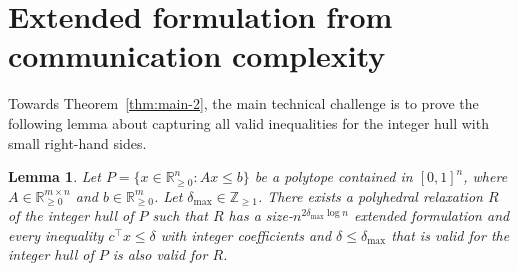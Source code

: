 \documentclass[11pt]{article}
\newcommand{\R}{\mathbb{R}}
\newcommand{\Z}{\mathbb{Z}}
\newcommand{\eps}{\varepsilon}
\newcommand{\rhs}{\delta}
\newtheorem{lemma}[theorem]{Lemma}
\newcommand{\lars}[1]{{\color{magenta}Lars: {#1} }}
\renewcommand{\epsilon}{\varepsilon}
\theoremstyle{remark}
\begin{document}


\section{Extended formulation from communication complexity}
\label{sec:depth-independent}
Towards Theorem~\ref{thm:main-2}, the main technical challenge is to prove the following lemma about capturing all valid inequalities for the integer hull with small right-hand sides. 

\begin{lemma} \label{lem:small-rhs}
Let $P = \{x \in \R^n_{\ge 0} : Ax \le b\}$ be a polytope contained in $[0,1]^n$, where $A \in \R_{\ge 0}^{m \times n}$ and $b \in \R_{\ge 0}^m$. Let $\rhs_{\max} \in \Z_{\ge 1}$. There exists a polyhedral relaxation $R$ of the integer hull of $P$ such that $R$ has a size-$n^{2
\rhs_{\max} \log n}$ extended formulation and every inequality $c^\intercal x \le \rhs$ with integer coefficients and $\rhs \le \rhs_{\max}$ that is valid for the integer hull of $P$ is also valid for $R$.
\end{lemma}
\end{document}
